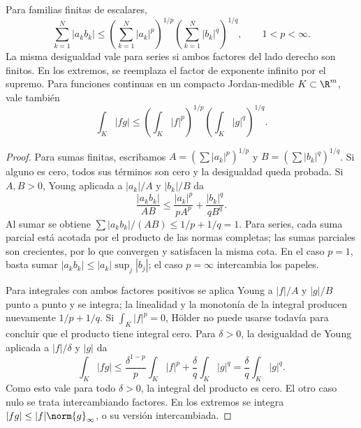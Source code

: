 \begin{teorema}[Hölder]\label{ch01:holder}
Para familias finitas de escalares,
\[
\sum_{k=1}^N|a_kb_k|\le
\left(\sum_{k=1}^N|a_k|^p\right)^{1/p}
\left(\sum_{k=1}^N|b_k|^q\right)^{1/q},\qquad 1<p<\infty.
\]
La misma desigualdad vale para series si ambos factores del lado derecho son finitos. En los extremos, se reemplaza el factor de exponente infinito por el supremo. Para funciones continuas en un compacto Jordan-medible $K\subset\R^m$, vale también
\[
\int_K|fg|\le \left(\int_K|f|^p\right)^{1/p}
\left(\int_K|g|^q\right)^{1/q}.
\]
\end{teorema}
\begin{proof}
Para sumas finitas, escribamos $A=(\sum|a_k|^p)^{1/p}$ y $B=(\sum|b_k|^q)^{1/q}$. Si alguno es cero, todos sus términos son cero y la desigualdad queda probada. Si $A,B>0$, Young aplicada a $|a_k|/A$ y $|b_k|/B$ da
\[
\frac{|a_kb_k|}{AB}\le\frac{|a_k|^p}{pA^p}+\frac{|b_k|^q}{qB^q}.
\]
Al sumar se obtiene $\sum|a_kb_k|/(AB)\le1/p+1/q=1$. Para series, cada suma parcial está acotada por el producto de las normas completas; las sumas parciales son crecientes, por lo que convergen y satisfacen la misma cota. En el caso $p=1$, basta sumar $|a_kb_k|\le|a_k|\sup_j|b_j|$; el caso $p=\infty$ intercambia los papeles.

Para integrales con ambos factores positivos se aplica Young a $|f|/A$ y $|g|/B$ punto a punto y se integra; la linealidad y la monotonía de la integral producen nuevamente $1/p+1/q$. Si $\int_K|f|^p=0$, Hölder no puede usarse todavía para concluir que el producto tiene integral cero. Para $\delta>0$, la desigualdad de Young aplicada a $|f|/\delta$ y $|g|$ da
\[
\int_K|fg|\le \frac{\delta^{1-p}}p\int_K|f|^p+
\frac\delta q\int_K|g|^q=\frac\delta q\int_K|g|^q.
\]
Como esto vale para todo $\delta>0$, la integral del producto es cero. El otro caso nulo se trata intercambiando factores. En los extremos se integra $|fg|\le |f|\norm{g}_\infty$, o su versión intercambiada.
\end{proof}

